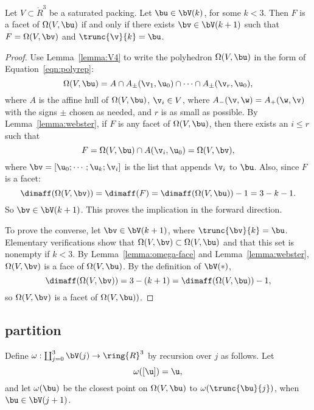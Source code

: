 \begin{lemma} Let $V\subset\ring{R}^3$ be a saturated packing.
Let $\bu\in \bV(k)$, for some $k<3$.   Then $F$ is a facet of $\Omega(V,\bu)$ if and only if
there exists $\bv\in \bV(k+1)$ such that $F = \Omega(V,\bv)$ and $\trunc{\v}{k} = \bu$.
\end{lemma}

\begin{proof}
Use Lemma~\ref{lemma:V4} to write the polyhedron $\Omega(V,\bu)$ in the form of Equation~\ref{eqn:polyrep}:
\begin{displaymath}
\Omega(V,\bu) = A \cap A_\pm(\v_1,\u_0) \cap \cdots\cap A_\pm(\v_r,\u_0),
\end{displaymath}
where $A$ is the affine hull of $\Omega(V,\bu)$, $\v_i\in V$, 
where $A_-(\v,\w) = A_+(\w,\v)$ with the signs $\pm$  chosen as
needed, 
and $r$ is as small as possible.
By Lemma~\ref{lemma:webster}, if $F$ is any facet of $\Omega(V,\bu)$, then there exists
an $i\le r$ such that 
\begin{displaymath}
F = \Omega(V,\bu) \cap A(\v_i,\u_0) = \Omega(V,\bv),
\end{displaymath}
where $\bv = [\u_0;\cdots;\u_k;\v_i]$ is the list that appends $\v_i$ to $\bu$.
Also, since $F$ is a facet:
\begin{displaymath}
\dimaff(\Omega(V,\bv)) = \dimaff(F) = \dimaff(\Omega(V,\bu)) - 1 = 3 - k - 1.
\end{displaymath}
So $\bv \in \bV(k+1)$.  This proves the implication in the forward direction.

To prove the converse, let $\bv\in \bV(k+1)$, where $\trunc{\bv}{k} = \bu$.
Elementary verifications show that $\Omega(V,\bv)\subset \Omega(V,\bu)$ and
that this set is nonempty if $k<3$.  By Lemma~\ref{lemma:omega-face} and Lemma~\ref{lemma:webster}, $\Omega(V,\bv)$ is a face of $\Omega(V,\bu)$.  By the definition of $\bV(*)$,
\begin{displaymath}
\dimaff(\Omega(V,\bv)) = 3 - (k+1) = \dimaff(\Omega(V,\bu)) -1,
\end{displaymath}
so $\Omega(V,\bv)$ is a facet of $\Omega(V,\bu))$.
\end{proof}

\subsection{partition}

\begin{definition}[$\omega$]
Define $\omega: \coprod_{j=0}^3 \bV(j)\to \ring{R}^3$ by recursion over $j$ as follows.
Let \begin{displaymath}
\omega([\u]) = \u,
\end{displaymath} and
let $\omega( \bu)$ be the closest point on $\Omega(V, \bu)$ to
$\omega( \trunc{\bu}{j})$, when $\bu\in \bV(j+1)$.
\end{definition}

